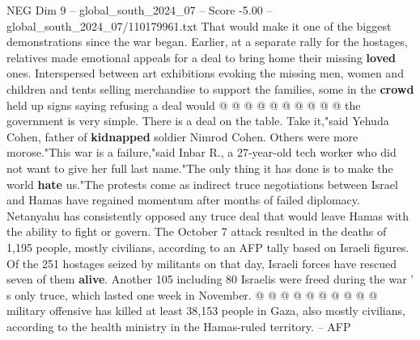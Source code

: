 \begin{textsample}{NEG Dim 9 – global\_south\_2024\_07 – Score -5.00 – global\_south\_2024\_07/110179961.txt}
That would make it one of the biggest demonstrations since the war began.
Earlier, at a separate rally for the hostages, relatives made emotional appeals for a deal to bring home their missing \textbf{loved} ones.
Interspersed between art exhibitions evoking the missing men, women and children and tents selling merchandise to support the families, some in the \textbf{crowd} held up signs saying refusing a deal would @ @ @ @ @ @ @ @ @ @ the government is very simple.
There is a deal on the table.
Take it,"said Yehuda Cohen, father of \textbf{kidnapped} soldier Nimrod Cohen.
Others were more morose."This war is a failure,"said Inbar R., a 27-year-old tech worker who did not want to give her full last name."The only thing it has done is to make the world \textbf{hate} us."The protests come as indirect truce negotiations between Israel and Hamas have regained momentum after months of failed diplomacy.
Netanyahu has consistently opposed any truce deal that would leave Hamas with the ability to fight or govern.
The October 7 attack resulted in the deaths of 1,195 people, mostly civilians, according to an AFP tally based on Israeli figures.
Of the 251 hostages seized by militants on that day, Israeli forces have rescued seven of them \textbf{alive}.
Another 105 including 80 Israelis were freed during the war ' s only truce, which lasted one week in November. @ @ @ @ @ @ @ @ @ @ military offensive has killed at least 38,153 people in Gaza, also mostly civilians, according to the health ministry in the Hamas-ruled territory. -- AFP

\end{textsample}
